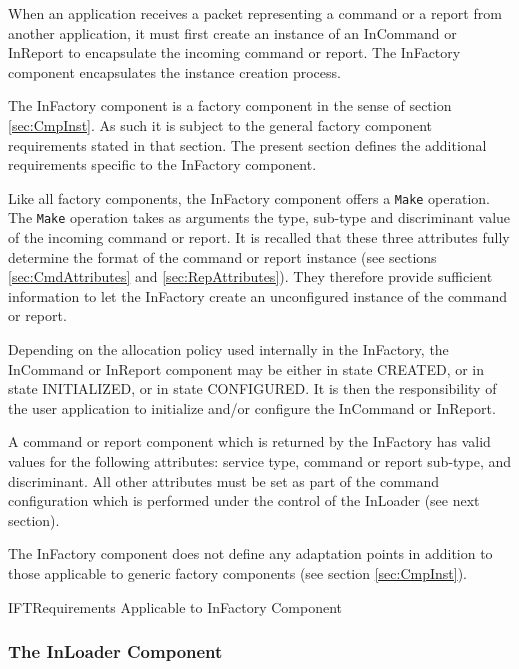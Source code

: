 \documentclass{pnp_article}
\begin{document}
When an application receives a packet representing a command or a report from another application, it must first create an instance of an InCommand or InReport to encapsulate the incoming command or report. The InFactory component encapsulates the instance creation process.

The InFactory component is a factory component in the sense of section \ref{sec:CmpInst}. As such it is subject to the general factory component requirements stated in that section. The present section defines the additional requirements specific to the InFactory component.

Like all factory components, the InFactory component offers a \texttt{Make} operation. The \texttt{Make} operation takes as arguments the type, sub-type and discriminant value of the incoming command or report. It is recalled that these three attributes fully determine the format of the command or report instance (see sections \ref{sec:CmdAttributes} and \ref{sec:RepAttributes}). They therefore provide sufficient information to let the InFactory create an unconfigured instance of the command or report.

Depending on the allocation policy used internally in the InFactory, the InCommand or InReport component may be either in state CREATED, or in state INITIALIZED, or in state CONFIGURED. It is then the responsibility of the user application to initialize and/or configure the InCommand or InReport.

A command or report component which is returned by the InFactory has valid values for the following attributes: service type, command or report sub-type, and discriminant. All other attributes must be set as part of the command configuration which is performed under the control of the InLoader (see next section).

The InFactory component does not define any adaptation points in addition to those applicable to generic factory components (see section \ref{sec:CmpInst}). 

\begin{crReq}{IFT}{Requirements Applicable to InFactory Component}
\end{crReq}


\subsubsection{The InLoader Component}\label{sec:InLoader}

\end{document}

